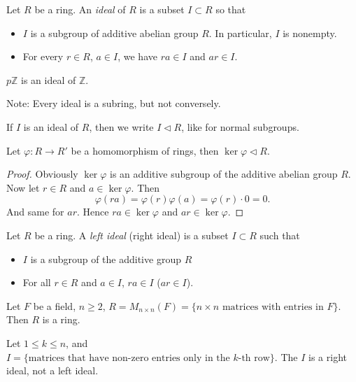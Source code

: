 \begin{definition}[Ideal]
	Let $R$ be a ring. An \textit{ideal} of $R$ is a subset $I \subset R$ so that
	\begin{itemize}
		\item $I$ is a subgroup of additive abelian group $R$. In particular, $I$ is nonempty.
		\item For every $r \in R$, $a \in I$, we have $ra \in I$ and $ar \in I$.
	\end{itemize}
\end{definition}
\begin{example}
	$p\mathbb{Z}$ is an ideal of $\mathbb{Z}$.

	Note: Every ideal is a subring, but not conversely.
\end{example}

\begin{notation}
	If $I$ is an ideal of $R$, then we write $I \triangleleft R$, like for normal subgroups.
\end{notation}

\begin{lemma}
	Let $\varphi: R \to R'$ be a homomorphism of rings, then $\operatorname{ker} \varphi \triangleleft R$.
\end{lemma}
\begin{proof}
	Obviously $\operatorname{ker} \varphi$ is an additive subgroup of the additive abelian group $R$. Now let $r \in R$ and $a \in \operatorname{ker} \varphi$. Then
	\[
		\varphi(ra) = \varphi(r)\varphi(a) = \varphi(r)\cdot 0 = 0
	.\] 
	And same for $ar$. Hence $ra \in \operatorname{ker} \varphi$ and $ar \in \operatorname{ker} \varphi$.
\end{proof}

\begin{definition}
	Let $R$ be a ring. A \textit{left ideal} (right ideal) is a subset $I \subset R$ such that
\begin{itemize}
	\item $I$ is a subgroup of the additive group $R$ 
	\item For all $r \in R$ and $a \in I$, $ra \in I$ ($ar \in I$).
\end{itemize}
\end{definition}

\begin{example}
	Let $F$ be a field, $n\ge 2$, $R = M_{n \times n}(F) = \{n \times n \text{ matrices with entries in }F\} $. Then $R$ is a ring.

	Let  $1\le k\le n$, and $I = \{\text{matrices that have non-zero entries only in the $k$-th row}\} $. The $I$ is a right ideal, not a left ideal.
\end{example}

